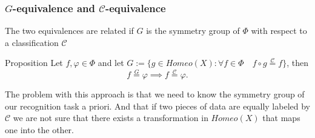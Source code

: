 \documentclass{beamer}
\newcommand{\mc}[1]{\mathcal{#1}}
\newcommand{\req}[1]{\stackrel{#1}{=}}
\begin{document}
\begin{frame}
    \frametitle{$G$-equivalence and $\mc{C}$-equivalence}
    The two equivalences are related if $G$ is the symmetry group of $\Phi$ with respect to a classification $\mc{C}$
    \begin{alertblock}{Proposition}
        Let $f,\varphi \in \Phi$ and let $G := \{ g \in Homeo(X) : \forall f \in \Phi \quad f \circ g \req{\mc{C}} f \}$, then
        \[ f \req{G} \varphi \implies f \req{\mc{C}} \varphi .\]
    \end{alertblock}
    The problem with this approach is that we need to know the symmetry group of our recognition task a priori. And that if two pieces of data
    are equally labeled by $\mc{C}$ we are not sure that there exists a transformation in $Homeo(X)$ that maps one into the other.
\end{frame}



        
\end{document}
